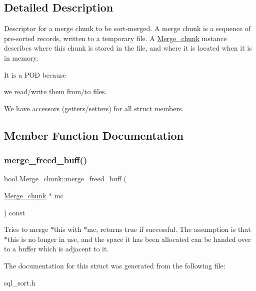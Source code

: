 \subsection{Detailed Description}
Descriptor for a merge chunk to be sort-\/merged. A merge chunk is a sequence of pre-\/sorted records, written to a temporary file. A \mbox{\hyperlink{structMerge__chunk}{Merge\+\_\+chunk}} instance describes where this chunk is stored in the file, and where it is located when it is in memory.

It is a P\+OD because
\begin{DoxyItemize}
\item we read/write them from/to files.
\end{DoxyItemize}

We have accessors (getters/setters) for all struct members. 

\subsection{Member Function Documentation}
\mbox{\label{structMerge__chunk_a16cbac8e4ee4b057a77268ab65b54c12}} 
\subsubsection{\texorpdfstring{merge\+\_\+freed\+\_\+buff()}{merge\_freed\_buff()}}
{\footnotesize\ttfamily bool Merge\+\_\+chunk\+::merge\+\_\+freed\+\_\+buff (\begin{DoxyParamCaption}\item[{\mbox{\hyperlink{structMerge__chunk}{Merge\+\_\+chunk}} $\ast$}]{mc }\end{DoxyParamCaption}) const\hspace{0.3cm}{\ttfamily [inline]}}

Tries to merge $\ast$this with $\ast$mc, returns true if successful. The assumption is that $\ast$this is no longer in use, and the space it has been allocated can be handed over to a buffer which is adjacent to it. 

The documentation for this struct was generated from the following file\+:\begin{DoxyCompactItemize}
\item 
sql\+\_\+sort.\+h\end{DoxyCompactItemize}
